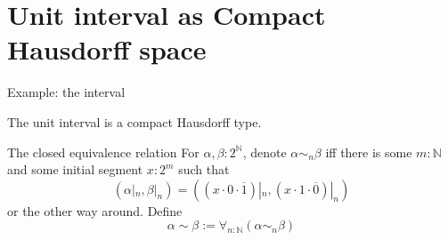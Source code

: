 \section{Unit interval as Compact Hausdorff space}
\begin{frame}{Example: the interval}
  \begin{lemma}
    The unit interval is a compact Hausdorff type. 
  \end{lemma}
  \begin{block}{The closed equivalence relation}
  For $\alpha,\beta:2^\mathbb N$, 
  \pause denote 
      $\alpha \sim_n \beta$ iff 
      \pause 
      there is some $m:\mathbb N$ and some 
      initial segment $x:2^m$ such that 
      \pause
      \vspace{-0.2cm}
      $$
      (\alpha|_n,\beta|_n)= 
      ( 
        (x \cdot 0 \cdot \overline 1)|_n , 
        (x \cdot 1 \cdot \overline 0)|_n
        ) 
      $$
      \vspace{-0.4cm}
      or the other way around. 
      \pause 
      Define 
      $$\alpha\sim\beta := \forall_{n:\mathbb N} (\alpha \sim_n \beta)$$
    \end{block}
\end{frame}

